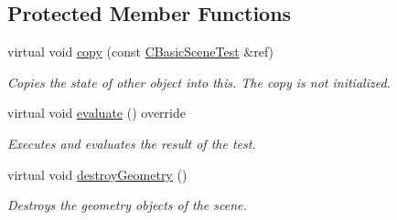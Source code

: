 \subsection*{Protected Member Functions}
\begin{DoxyCompactItemize}
\item 
\mbox{\label{class_unit_test_1_1_c_basic_scene_test_a3749e2dfaa86372e98a9579de69fbcc1}} 
virtual void \mbox{\hyperlink{class_unit_test_1_1_c_basic_scene_test_a3749e2dfaa86372e98a9579de69fbcc1}{copy}} (const \mbox{\hyperlink{class_unit_test_1_1_c_basic_scene_test}{C\+Basic\+Scene\+Test}} \&ref)
\begin{DoxyCompactList}\small\item\em Copies the state of other object into this. The copy is not initialized. \end{DoxyCompactList}\item 
\mbox{\label{class_unit_test_1_1_c_basic_scene_test_a0cc9e28bca579f4cecbee142eb192085}} 
virtual void \mbox{\hyperlink{class_unit_test_1_1_c_basic_scene_test_a0cc9e28bca579f4cecbee142eb192085}{evaluate}} () override
\begin{DoxyCompactList}\small\item\em Executes and evaluates the result of the test. \end{DoxyCompactList}\item 
\mbox{\label{class_unit_test_1_1_c_basic_scene_test_aefedf746ed79b85440f8d5c06b6690c9}} 
virtual void \mbox{\hyperlink{class_unit_test_1_1_c_basic_scene_test_aefedf746ed79b85440f8d5c06b6690c9}{destroy\+Geometry}} ()
\begin{DoxyCompactList}\small\item\em Destroys the geometry objects of the scene. \end{DoxyCompactList}\end{DoxyCompactItemize}

